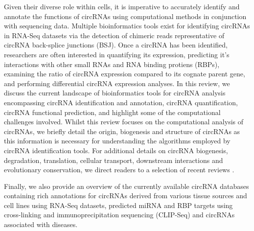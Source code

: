 \documentclass[journal,review,submit,pdftex,moreauthors]{Definitions/mdpi}
\begin{document}
Given their diverse role within cells, it is imperative to accurately identify and annotate the functions of circRNAs using computational methods in conjunction with sequencing data. Multiple bioinformatics tools exist for identifying circRNAs in RNA-Seq datasets via the detection of chimeric reads representative of circRNA back-splice junctions (BSJ). Once a circRNA has been identified, researchers are often interested in quantifying its expression, predicting it's interactions with other small RNAs and RNA binding protiens (RBPs), examining the ratio of circRNA expression compared to its cognate parent gene, and performing differential circRNA expression analyses. In this review, we discuss the current landscape of bioinformatics tools for circRNA analysis encompassing circRNA identification and annotation, circRNA quantification, circRNA functional prediction, and highlight some of the computational challenges involved. Whilst this review focuses on the computational analysis of circRNAs, we briefly detail the origin, biogenesis and structure of circRNAs as this information is necessary for understanding the algorithms employed by circRNA identification tools. For additional details on circRNA biogenesis, degradation, translation, cellular transport, downstream interactions and evolutionary conservation, we direct readers to a selection of recent reviews \cite{Greene2017Jun, Kristensen2019Nov, Li2018Aug, Ren2022Dec, Yang2021May, Huang2020, Panda2018, Santos-Rodriguez2021Sep}. \par

Finally, we also provide an overview of the currently available circRNA databases containing rich annotations for circRNAs derived from various tissue sources and cell lines using RNA-Seq datasets, predicted miRNA and RBP targets using cross-linking and immunoprecipitation sequencing (CLIP-Seq) and circRNAs associated with diseases. 
\end{document}
